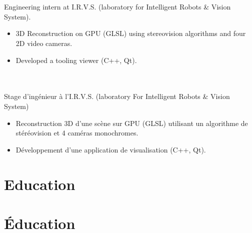 \documentclass{resume}
\begin{document}
 {
   \\
   \\
  Engineering intern at I.R.V.S. (laboratory for Intelligent Robots \& Vision System). \\
  \begin{itemize}
  	\item 3D Reconstruction on GPU (GLSL) using stereovision algorithms and four 2D video cameras.
  	\item Developed a tooling viewer (C++, Qt).
  \end{itemize}
} {
   \\
   \\
  Stage d'ing\'{e}nieur \`{a} l'I.R.V.S. (laboratory For Intelligent Robots \& Vision System) \\
  \begin{itemize}
  	\item Reconstruction 3D d'une sc\`{e}ne sur GPU (GLSL) utilisant un algorithme
  		de st\'{e}r\'{e}ovision et 4 cam\'{e}ras monochromes.
  	\item D\'{e}veloppement d'une application de visualisation (C++, Qt).
  \end{itemize}
}

 {
  \section{{\faGraduationCap} Education}
} {
  \section{{\faGraduationCap} \'{E}ducation}
}

 \\
 {
   \\
   \\
} {
   \\
   \\
}
\end{document}
